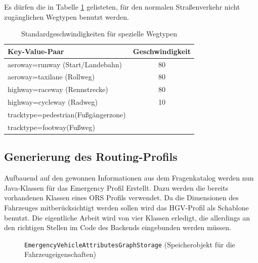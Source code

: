 \documentclass[12pt,a4paper]{article}
\begin{document}
Es dürfen die in Tabelle \ref{tab:speedinfospecial} gelisteten, für den normalen Straßenverkehr nicht zugänglichen Wegtypen benutzt werden.

\begin{table}
\caption{Standardgeschwindigkeiten für spezielle Wegtypen}
\label{tab:speedinfospecial}
\centering
\begin{tabular}{|l|c|}
\hline
\multicolumn{1}{|l|}{Key-Value-Paar}  & \multicolumn{1}{c|}{Geschwindigkeit} \\
\hline
aeroway=runway (Start/Landebahn) & 80 \\
aeroway=taxilane (Rollweg) & 80 \\
highway=raceway (Rennstrecke) & 80 \\
highway=cycleway (Radweg) & 10 \\
tracktype=pedestrian(Fußgängerzone) & \\
tracktype=footway(Fußweg) & \\
\hline
\end{tabular}
\end{table}



\subsection{Generierung des Routing-Profils}
\label{backendGraphBuild}

Aufbauend auf den gewonnen Informationen aus dem Fragenkatalog werden nun Java-Klassen für das Emergency Profil Erstellt. Dazu werden die bereits vorhandenen Klassen eines ORS Profils verwendet.
Da die Dimensionen des Fahrzeuges mitberücksichtigt werden sollen wird das HGV-Profil als Schablone benutzt.
Die eigentliche Arbeit wird von vier Klassen erledigt, die allerdings an den richtigen Stellen im Code des Backends eingebunden werden müssen.

\begin{figure}[h]

\caption{\lstinline!EmergencyVehicleAttributesGraphStorage! \textit\footnotesize{(Speicherobjekt für die Fahrzeugeigenschaften)}}
\label{cod:storage}
\end{figure}
\end{document}
